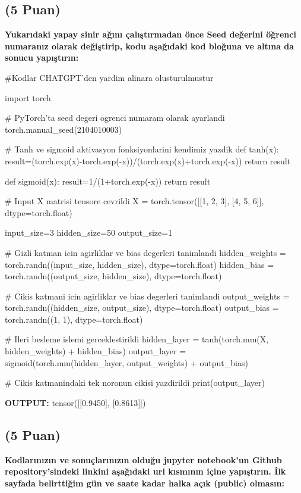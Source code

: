 \documentclass[11pt]{article}
\begin{document}
\subsection{(5 Puan)} \textbf{Yukarıdaki yapay sinir ağını çalıştırmadan önce Seed değerini öğrenci numaranız olarak değiştirip, kodu aşağıdaki kod bloğuna ve altına da sonucu yapıştırın:}

\begin{python}
#Kodlar CHATGPT'den yardim alinara olusturulmustur

import torch

# PyTorch'ta seed degeri ogrenci numaram olarak ayarlandi
torch.manual_seed(2104010003)

# Tanh ve sigmoid aktivasyon fonksiyonlarini kendimiz yazdik
def tanh(x):
    result=(torch.exp(x)-torch.exp(-x))/(torch.exp(x)+torch.exp(-x))
    return result

def sigmoid(x):
    result=1/(1+torch.exp(-x)) 
    return result

# Input X matrisi tensore cevrildi
X = torch.tensor([[1, 2, 3], [4, 5, 6]], dtype=torch.float)

input_size=3
hidden_size=50
output_size=1

# Gizli katman icin agirliklar ve bias degerleri tanimlandi
hidden_weights = torch.randn((input_size, hidden_size), dtype=torch.float)
hidden_bias = torch.randn((output_size, hidden_size), dtype=torch.float)

# Cikis katmani icin agirliklar ve bias degerleri tanimlandi
output_weights = torch.randn((hidden_size, output_size), dtype=torch.float)
output_bias = torch.randn((1, 1), dtype=torch.float)

# Ileri besleme islemi gerceklestirildi
hidden_layer = tanh(torch.mm(X, hidden_weights) + hidden_bias)
output_layer = sigmoid(torch.mm(hidden_layer, output_weights) + output_bias)

# Cikis katmanindaki tek noronun cikisi yazdirildi
print(output_layer)

\end{python}

\textbf{OUTPUT:}
tensor([[0.9450],
        [0.8613]])

\subsection{(5 Puan)} \textbf{Kodlarınızın ve sonuçlarınızın olduğu jupyter notebook'un Github repository'sindeki linkini aşağıdaki url kısmının içine yapıştırın. İlk sayfada belirttiğim gün ve saate kadar halka açık (public) olmasın:}
\end{document}
